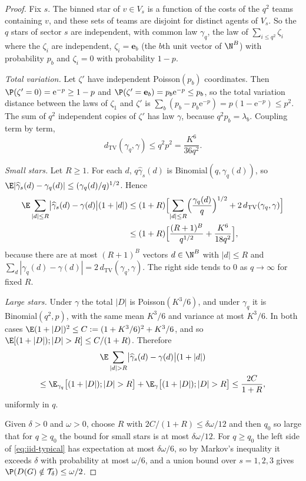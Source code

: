 \begin{proof}
Fix $s$. The binned star of $v\in V_s$ is a function of the costs of the $q^2$ teams
containing $v$, and these sets of teams are disjoint for distinct agents of $V_s$. So the
$q$ stars of sector $s$ are independent, with common law $\gamma_q$, the law of
$\sum_{i\le q^2}\zeta_i$ where the $\zeta_i$ are independent, $\zeta_i=\mathbf{e}_b$ (the
$b$th unit vector of $\N^B$) with probability $p_b$ and $\zeta_i=0$ with probability
$1-p$.

\emph{Total variation.} Let $\zeta'$ have independent Poisson$(p_b)$ coordinates. Then
$\P(\zeta'=0)=\mathrm{e}^{-p}\ge1-p$ and
$\P(\zeta'=\mathbf{e}_b)=p_b\mathrm{e}^{-p}\le p_b$, so the total variation distance
between the laws of $\zeta_1$ and $\zeta'$ is
$\sum_b(p_b-p_b\mathrm{e}^{-p})=p(1-\mathrm{e}^{-p})\le p^2$. The sum of $q^2$ independent
copies of $\zeta'$ has law $\gamma$, because $q^2p_b=\lambda_b$. Coupling term by term,
\[
d_{\mathrm{TV}}(\gamma_q,\gamma)\le q^2p^2=\frac{K^6}{36q^2}.
\]

\emph{Small stars.} Let $R\ge1$. For each $d$, $q\widehat\gamma_s(d)$ is
Binomial$(q,\gamma_q(d))$, so
$\E|\widehat\gamma_s(d)-\gamma_q(d)|\le(\gamma_q(d)/q)^{1/2}$. Hence
\begin{align*}
\E\sum_{|d|\le R}\bigl|\widehat\gamma_s(d)-\gamma(d)\bigr|(1+|d|)
&\le(1+R)\Bigl[\sum_{|d|\le R}\Bigl(\frac{\gamma_q(d)}{q}\Bigr)^{1/2}
 +2\,d_{\mathrm{TV}}(\gamma_q,\gamma)\Bigr]\\
&\le(1+R)\Bigl[\frac{(R+1)^B}{q^{1/2}}+\frac{K^6}{18q^2}\Bigr],
\end{align*}
because there are at most $(R+1)^B$ vectors $d\in\N^B$ with $|d|\le R$ and
$\sum_d|\gamma_q(d)-\gamma(d)|=2\,d_{\mathrm{TV}}(\gamma_q,\gamma)$. The right side tends to
$0$ as $q\to\infty$ for fixed $R$.

\emph{Large stars.} Under $\gamma$ the total $|D|$ is Poisson$(K^3/6)$, and under
$\gamma_q$ it is Binomial$(q^2,p)$, with the same mean $K^3/6$ and variance at most
$K^3/6$. In both cases $\E(1+|D|)^2\le C:=(1+K^3/6)^2+K^3/6$, and so
$\E[(1+|D|);|D|>R]\le C/(1+R)$. Therefore
\begin{multline*}
\E\sum_{|d|>R}\bigl|\widehat\gamma_s(d)-\gamma(d)\bigr|(1+|d|)\\
\le\E_{\gamma_q}\bigl[(1+|D|);|D|>R\bigr]+\E_{\gamma}\bigl[(1+|D|);|D|>R\bigr]
\le\frac{2C}{1+R},
\end{multline*}
uniformly in $q$.

Given $\delta>0$ and $\omega>0$, choose $R$ with $2C/(1+R)\le\delta\omega/12$ and then
$q_0$ so large that for $q\ge q_0$ the bound for small stars is at most $\delta\omega/12$.
For $q\ge q_0$ the left side of \eqref{eq:iid-typical} has expectation at most
$\delta\omega/6$, so by Markov's inequality it exceeds $\delta$ with probability at most
$\omega/6$, and a union bound over $s=1,2,3$ gives
$\P(D(G)\notin\mathcal{T}_\delta)\le\omega/2$.
\end{proof}

